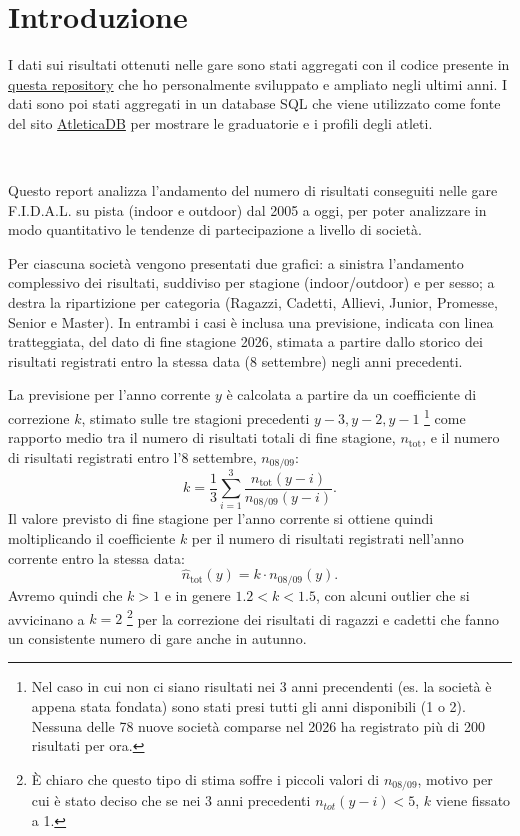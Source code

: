 \documentclass[a4paper, landscape]{article}
\begin{document}
\clearpage
\thispagestyle{fancy}
\tableofcontents
\clearpage

\section{Introduzione}

I dati sui risultati ottenuti nelle gare sono stati aggregati con il codice
presente in \href{https://github.com/F-Depi/database-atletica-italiana/}{questa repository} 
che ho personalmente sviluppato e ampliato negli ultimi anni.
I dati sono poi stati aggregati in un database SQL che viene utilizzato come
fonte del sito \href{https://atletica.mooo.com}{AtleticaDB} per mostrare le
graduatorie e i profili degli atleti.

~

Questo report analizza l'andamento del numero di risultati conseguiti nelle gare
F.I.D.A.L. su pista (indoor e outdoor) dal 2005 a oggi, per poter analizzare in
modo quantitativo le tendenze di partecipazione a livello di società.

Per ciascuna società vengono presentati due grafici: a sinistra l'andamento
complessivo dei risultati, suddiviso per stagione (indoor/outdoor) e per sesso;
a destra la ripartizione per categoria (Ragazzi, Cadetti, Allievi, Junior,
Promesse, Senior e Master).
In entrambi i casi è inclusa una previsione, indicata con linea tratteggiata,
del dato di fine stagione 2026, stimata a partire dallo storico dei risultati
registrati entro la stessa data (8 settembre) negli anni precedenti.

La previsione per l'anno corrente $y$ è calcolata a partire da un coefficiente
di correzione $k$, stimato sulle tre stagioni precedenti $y-3, y-2, y-1$ 
\footnote{Nel caso in cui non ci siano risultati nei 3 anni precendenti (es. la
società è appena stata fondata) sono stati presi tutti gli anni disponibili (1 o
2). Nessuna delle 78 nuove società comparse nel 2026 ha registrato più di 200 
risultati per ora.}
come rapporto medio tra il numero di risultati totali di fine stagione, 
$n_{\text{tot}}$, e il numero di risultati registrati entro l'8 settembre, 
$n_{\text{08/09}}$:
\[
    k = \frac{1}{3}\sum_{i=1}^{3} \frac{n_{\text{tot}}(y-i)}{n_{\text{08/09}}(y-i)}.
\]
Il valore previsto di fine stagione per l'anno corrente si ottiene quindi
moltiplicando il coefficiente $k$ per il numero di risultati registrati
nell'anno corrente entro la stessa data:
\[
    \hat{n}_{\text{tot}}(y) = k \cdot n_{\text{08/09}}(y).
\]
Avremo quindi che $k > 1$ e in genere $1.2 < k < 1.5$, con alcuni outlier che
si avvicinano a $k = 2$
\footnote{È chiaro che questo tipo di stima soffre i piccoli valori di $n_{08/09}$,
motivo per cui è stato deciso che se nei 3 anni precedenti $n_{tot}(y-i) < 5$,
$k$ viene fissato a 1.}
per la correzione dei risultati di ragazzi e cadetti che fanno un consistente 
numero di gare anche in autunno.
\end{document}
